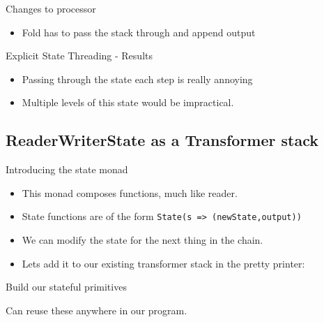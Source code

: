 \documentclass[professionalFonts,aspectratio=169]{beamer}
\begin{document}
\begin{frame}{Changes to processor}
\begin{itemize}
\item Fold has to pass the stack through and append output
\end{itemize}

\pause



\end{frame}

\begin{frame}{Explicit State Threading - Results}
\begin{itemize}
\item Passing through the state each step is really annoying
\pause \item Multiple levels of this state would be impractical.
\end{itemize}

\end{frame}

\subsection{ReaderWriterState as a Transformer stack}

\begin{frame}{Introducing the state monad}
\begin{itemize}
\item This monad composes functions, much like reader.
\pause \item State functions are of the form \texttt{State(s => (newState,output)) }
\pause \item We can modify the state for the next thing in the chain.
\pause \item Lets add it to our existing transformer stack in the pretty printer:
\end{itemize}

\pause



\end{frame}

\begin{frame}{Build our stateful primitives}

Can reuse these anywhere in our program.


\end{frame}
\end{document}
